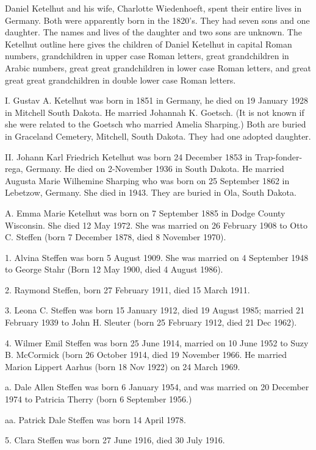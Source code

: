 \documentclass[a4paper]{article}
\begin{document}
	Daniel Ketelhut and his wife, Charlotte Wiedenhoeft,  spent their entire lives in Germany. Both were apparently born in the 1820's.  They had seven sons and one daughter.   The names and lives of the daughter and two sons are unknown.  The Ketelhut outline here gives the children of Daniel Ketelhut in capital Roman numbers, grandchildren in upper case Roman letters, great grandchildren in Arabic numbers, great great grandchildren in lower case Roman letters, and great great great grandchildren in double lower case Roman letters.

I. Gustav A. Ketelhut was born in 1851 in Germany, he died on 19 January 1928 in Mitchell South Dakota.  He married Johannah K. Goetsch.  (It is not known if she were related to the Goetsch who married Amelia Sharping.)  Both are buried in Graceland Cemetery, Mitchell, South Dakota.  They had one adopted daughter.

II. Johann Karl Friedrich Ketelhut was born 24 December 1853 in Trap-fonder-rega, Germany.  He died on 2-November 1936 in South Dakota.  He married Augusta Marie Wilhemine Sharping who was born on 25 September 1862 in Lebetzow, Germany.  She died in 1943.  They are buried in Ola, South Dakota.

A. Emma Marie Ketelhut was born on 7 September 1885 in Dodge County Wisconsin.	She died 12 May 1972.  She was married on 26 February 1908 to Otto C. Steffen (born 7 December 1878, died 8 November 1970).
 
1.  Alvina Steffen was born 5 August 1909.  She was married on 4 September 1948 to George Stahr (Born 12 May 1900, died 4 August 1986).
 
2. Raymond Steffen, born 27 February 1911, died 15 March 1911.

3. Leona C. Steffen was born 15 January 1912, died 19 August 1985;  married 21 February 1939 to John H. Sleuter (born 25 February 1912, died 21 Dec 1962).
 
4. Wilmer Emil Steffen was born 25 June 1914, married on 10 June 1952 to Suzy B. McCormick (born 26 October 1914, died 19 November 1966.  He married Marion Lippert Aarhus (born 18 Nov 1922) on 24 March 1969.
  
a. Dale Allen Steffen was born 6 January 1954, and was married on 20 December 1974 to Patricia Therry (born 6 September 1956.)
 
aa. Patrick Dale Steffen was born 14 April 1978.

5. Clara Steffen was born 27 June 1916, died 30 July 1916.
\end{document}
